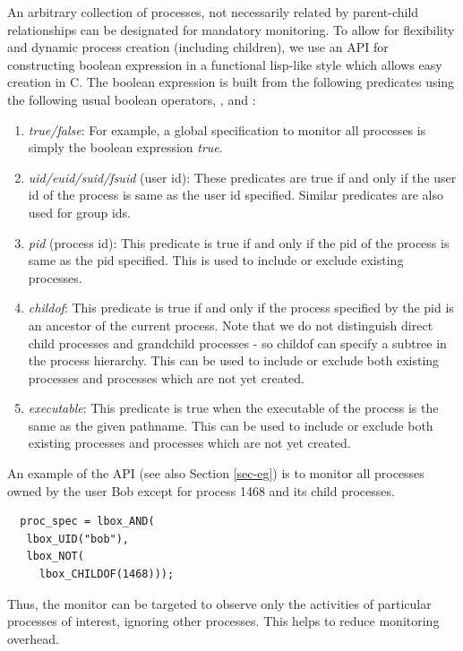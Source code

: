 An arbitrary collection of processes, not necessarily related by parent-child
relationships can be designated for mandatory monitoring.
To allow for flexibility and dynamic process creation (including children),
we use an API for constructing boolean expression in a functional lisp-like
style which allows easy creation in C.
The boolean expression is built from the following predicates using
the following usual boolean operators, ,  and :

\begin{enumerate}

\item {\em true/false}:
For example, a global specification to monitor all
processes is simply the boolean expression {\em true}.

\item {\em uid/euid/suid/fsuid} (user id):
These predicates are true if and only if the
user id of the process is same as the user id specified.
Similar predicates are also used for group ids.

\item {\em pid} (process id):
This predicate is true if and only if the pid of the process
is same as the pid specified.
This is used to include or exclude existing processes.

\item {\em childof}:
This predicate is true if and only if the process specified by the pid
is an ancestor of the current process.
Note that we do not distinguish direct child processes
and grandchild processes - so childof can specify a subtree in the
process hierarchy.
This can be used to include or exclude both existing processes and processes
which are not yet created.

\item {\em executable}:
This predicate is true 
when the executable of the process is the same as the given pathname.
This can be used to include or exclude both existing processes and processes
which are not yet created.

\end{enumerate}

\noindent
An example of the API (see also Section \ref{sec-eg}) is to monitor
all processes owned by the user Bob
except for process 1468 and its child processes.
{\small
\begin{verbatim}
  proc_spec = lbox_AND(
   lbox_UID("bob"),
   lbox_NOT(
     lbox_CHILDOF(1468)));
\end{verbatim}
}
Thus, the monitor can be targeted to observe only the activities
of particular processes of interest, ignoring other processes. 
This helps to reduce monitoring overhead.

